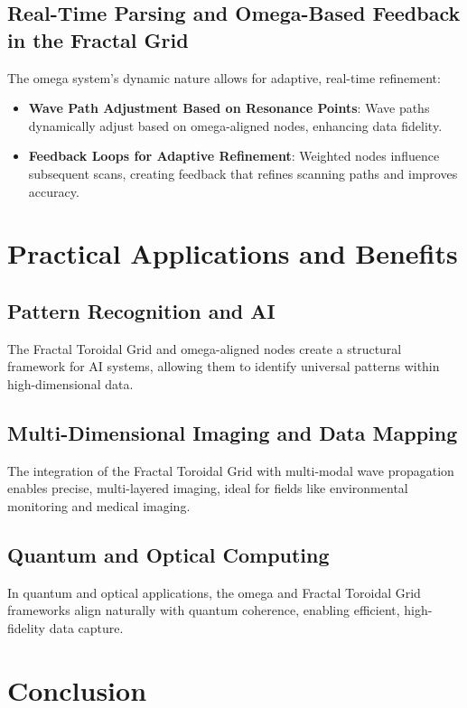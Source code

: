 \documentclass{article}
\begin{document}
\subsection{Real-Time Parsing and Omega-Based Feedback in the Fractal Grid}

The omega system’s dynamic nature allows for adaptive, real-time refinement:
\begin{itemize}
    \item \textbf{Wave Path Adjustment Based on Resonance Points}: Wave paths dynamically adjust based on omega-aligned nodes, enhancing data fidelity.
    \item \textbf{Feedback Loops for Adaptive Refinement}: Weighted nodes influence subsequent scans, creating feedback that refines scanning paths and improves accuracy.
\end{itemize}

\section{Practical Applications and Benefits}

\subsection{Pattern Recognition and AI}

The Fractal Toroidal Grid and omega-aligned nodes create a structural framework for AI systems, allowing them to identify universal patterns within high-dimensional data.

\subsection{Multi-Dimensional Imaging and Data Mapping}

The integration of the Fractal Toroidal Grid with multi-modal wave propagation enables precise, multi-layered imaging, ideal for fields like environmental monitoring and medical imaging.

\subsection{Quantum and Optical Computing}

In quantum and optical applications, the omega and Fractal Toroidal Grid frameworks align naturally with quantum coherence, enabling efficient, high-fidelity data capture.

\section{Conclusion}
\end{document}
